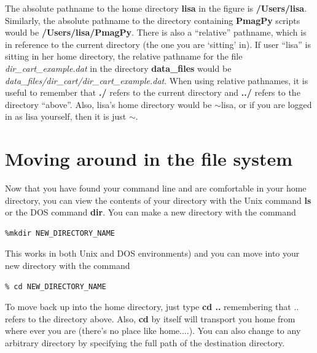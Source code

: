 \documentclass[11pt]{book}
\begin{document}
{The absolute pathname to the home directory {\bf lisa} in the figure is {\bf /Users/lisa}.
Similarly, the absolute pathname to the directory containing {\bf PmagPy}
scripts  would be  {\bf /Users/lisa/PmagPy}.  There is also a ``relative'' pathname,
which is in reference to the  current directory (the one you are `sitting' in).  If user ``lisa'' is sitting in
her home directory, the relative pathname for the file {\it dir\_cart\_example.dat} in the directory
{\bf data\_files} would be {\it data\_files/dir\_cart/dir\_cart\_example.dat}.  When using relative
pathnames, it is useful to remember that {\bf ./} refers to the current
directory and {\bf ../} refers to the directory  ``above''.     Also, lisa's home directory would be $\sim$lisa, or if you are logged in as lisa yourself, then it is just $\sim$.



\section{Moving around in the file system}

Now that you have found your command line and are comfortable in your home directory, you can view the contents of your directory with the Unix command {\bf ls} or the DOS command {\bf dir}.
You can make a new directory with the command
\begin{verbatim}
%mkdir NEW_DIRECTORY_NAME
\end{verbatim}
This works in both Unix and DOS environments) and you can move into your new directory with the command
\begin{verbatim}
% cd NEW_DIRECTORY_NAME
\end{verbatim}
   To move back up into the home directory, just type {\bf cd ..} remembering that .. refers to the directory above.  Also, {\bf cd} by itself will transport you home from where ever you are (there's no place like home....).     You can also change to any arbitrary directory by specifying the full path of the destination directory.


%
%

}
\end{document}
